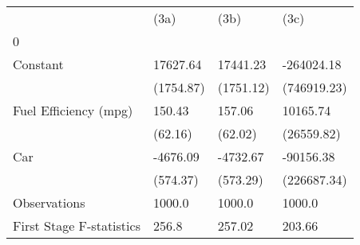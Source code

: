 \begin{tabular}{llll}
\toprule
{} &       (3a) &       (3b) &         (3c) \\
0                        &            &            &              \\
\midrule
Constant                 &   17627.64 &   17441.23 &   -264024.18 \\
                         &  (1754.87) &  (1751.12) &  (746919.23) \\
Fuel Efficiency (mpg)    &     150.43 &     157.06 &     10165.74 \\
                         &    (62.16) &    (62.02) &   (26559.82) \\
Car                      &   -4676.09 &   -4732.67 &    -90156.38 \\
                         &   (574.37) &   (573.29) &  (226687.34) \\
Observations             &     1000.0 &     1000.0 &       1000.0 \\
First Stage F-statistics &      256.8 &     257.02 &       203.66 \\
\bottomrule
\end{tabular}
